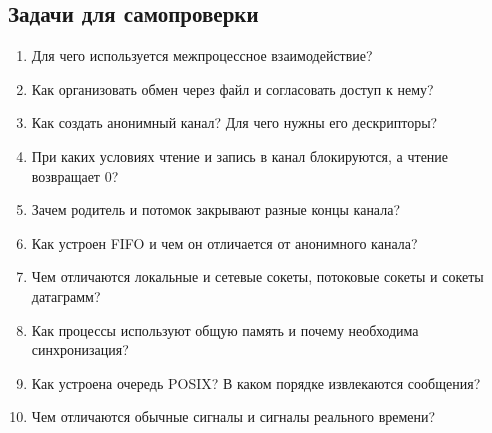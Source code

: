 \par\begin{samepage}
\section{Задачи для самопроверки}
\begin{enumerate}[nosep]
  \item Для чего используется межпроцессное взаимодействие?
  \item Как организовать обмен через файл и согласовать доступ к нему?
  \item Как создать анонимный канал? Для чего нужны его дескрипторы?
  \item При каких условиях чтение и запись в канал блокируются, а чтение возвращает 0?
  \item Зачем родитель и потомок закрывают разные концы канала?
  \item Как устроен FIFO и чем он отличается от анонимного канала?
  \item Чем отличаются локальные и сетевые сокеты, потоковые сокеты и сокеты датаграмм?
  \item Как процессы используют общую память и почему необходима синхронизация?
  \item Как устроена очередь POSIX? В каком порядке извлекаются сообщения?
  \item Чем отличаются обычные сигналы и сигналы реального времени?
\end{enumerate}
\end{samepage}
\par
\clearpage
\endgroup